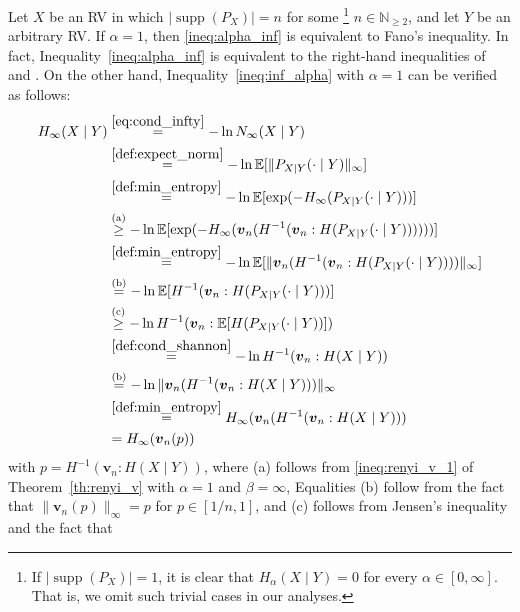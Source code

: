 \documentclass[conference, draftcls, onecolumn]{IEEEtran}
\theoremstyle{plain}
\newcommand{\bvec}[1]{\boldsymbol{#1}}
\newcommand{\supp}{\operatorname{supp}}
\newcommand{\thref}[1]{Theorem~\ref{#1}}
\begin{document}
\begin{IEEEproof}[Proof of \thref{th:A_renyi_alpha_inf}]
Let $X$ be an RV in which $|\!\supp(P_{X})| = n$ for some%
\footnote{If $|\!\supp( P_{X} )| = 1$, it is clear that $H_{\alpha}(X \mid Y) = 0$ for every $\alpha \in [0, \infty]$. That is, we omit such trivial cases in our analyses.}
$n \in \mathbb{N}_{\ge 2}$, and let $Y$ be an arbitrary RV.
If $\alpha = 1$, then \eqref{ineq:alpha_inf} is equivalent to Fano's inequality.
In fact, Inequality~\eqref{ineq:alpha_inf} is equivalent to the right-hand inequalities of \cite[Eq.~(15)]{kovalevsky} and \cite[Eq.~(5)]{tebbe}.
On the other hand, Inequality~\eqref{ineq:inf_alpha} with $\alpha = 1$ can be verified as follows:
\begin{align}
H_{\infty}(X \mid Y)
& \overset{\eqref{eq:cond_infty}}{=}
- \ln N_{\infty}(X \mid Y)
\\
& \overset{\eqref{def:expect_norm}}{=}
- \ln \mathbb{E}[ \| P_{X|Y}(\cdot \mid Y) \|_{\infty} ]
\\
& \overset{\eqref{def:min_entropy}}{=}
- \ln \mathbb{E}[ \exp( - H_{\infty}( P_{X|Y}(\cdot \mid Y) ) ) ]
\\
& \overset{\text{(a)}}{\ge}
- \ln \mathbb{E}[ \exp( - H_{\infty}( \bvec{v}_{n}( H^{-1}( \bvec{v}_{n} : H( P_{X|Y}(\cdot \mid Y) ) ) ) ) ) ]
\\
& \overset{\eqref{def:min_entropy}}{=}
- \ln \mathbb{E}[ \| \bvec{v}_{n}( H^{-1}( \bvec{v}_{n} : H( P_{X|Y}(\cdot \mid Y) ) ) ) \|_{\infty} ]
\\
& \overset{\text{(b)}}{=}
- \ln \mathbb{E}[ H^{-1}( \bvec{v}_{n} : H( P_{X|Y}(\cdot \mid Y) ) ) ]
\\
& \overset{\text{(c)}}{\ge}
- \ln H^{-1}( \bvec{v}_{n} : \mathbb{E}[ H( P_{X|Y}(\cdot \mid Y) ) ] )
\\
& \overset{\eqref{def:cond_shannon}}{=}
- \ln H^{-1}( \bvec{v}_{n} : H(X \mid Y) )
\\
& \overset{\text{(b)}}{=}
- \ln \| \bvec{v}_{n}( H^{-1}( \bvec{v}_{n} : H(X \mid Y) ) ) \|_{\infty}
\\
& \overset{\eqref{def:min_entropy}}{=}
H_{\infty}( \bvec{v}_{n}( H^{-1}( \bvec{v}_{n} : H(X \mid Y) ) )
\\
& =
H_{\infty}( \bvec{v}_{n}( p ) )
\end{align}
with $p = H^{-1}( \bvec{v}_{n} : H(X \mid Y) )$, where (a) follows from \eqref{ineq:renyi_v_1} of \thref{th:renyi_v} with $\alpha = 1$ and $\beta = \infty$, Equalities (b) follow from the fact that $\| \bvec{v}_{n}( p ) \|_{\infty} = p$ for $p \in [1/n, 1]$, and (c) follows from Jensen's inequality and the fact that

\end{IEEEproof}
\end{document}
